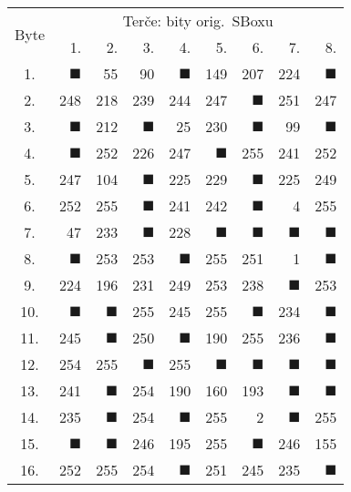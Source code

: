 \begin{tabular}{| c | r | r | r | r | r | r | r | r |}
	\hline
	\multirow{2}{*}{Byte} & \multicolumn{8}{c|}{Terče: bity orig.\ SBoxu} \\
	\cline{2-9}
	~ & 1. & 2. & 3. & 4. & 5. & 6. & 7. & 8. \\
	\hline
	1.&$\blacksquare$&55&90&$\blacksquare$&149&207&224&$\blacksquare$\\
	\hline
	2.&248&218&239&244&247&$\blacksquare$&251&247\\
	\hline
	3.&$\blacksquare$&212&$\blacksquare$&25&230&$\blacksquare$&99&$\blacksquare$\\
	\hline
	4.&$\blacksquare$&252&226&247&$\blacksquare$&255&241&252\\
	\hline
	5.&247&104&$\blacksquare$&225&229&$\blacksquare$&225&249\\
	\hline
	6.&252&255&$\blacksquare$&241&242&$\blacksquare$&4&255\\
	\hline
	7.&47&233&$\blacksquare$&228&$\blacksquare$&$\blacksquare$&$\blacksquare$&$\blacksquare$\\
	\hline
	8.&$\blacksquare$&253&253&$\blacksquare$&255&251&1&$\blacksquare$\\
	\hline
	9.&224&196&231&249&253&238&$\blacksquare$&253\\
	\hline
	10.&$\blacksquare$&$\blacksquare$&255&245&255&$\blacksquare$&234&$\blacksquare$\\
	\hline
	11.&245&$\blacksquare$&250&$\blacksquare$&190&255&236&$\blacksquare$\\
	\hline
	12.&254&255&$\blacksquare$&255&$\blacksquare$&$\blacksquare$&$\blacksquare$&$\blacksquare$\\
	\hline
	13.&241&$\blacksquare$&254&190&160&193&$\blacksquare$&$\blacksquare$\\
	\hline
	14.&235&$\blacksquare$&254&$\blacksquare$&255&2&$\blacksquare$&255\\
	\hline
	15.&$\blacksquare$&$\blacksquare$&246&195&255&$\blacksquare$&246&155\\
	\hline
	16.&252&255&254&$\blacksquare$&251&245&235&$\blacksquare$\\
	\hline
\end{tabular}